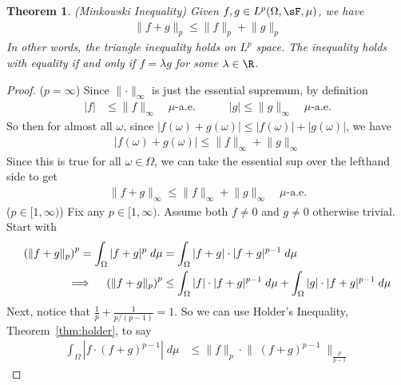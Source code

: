 \documentclass[12pt]{article}
\theoremstyle{plain}
\newtheorem{thm}{Theorem}[section]
\theoremstyle{definition}
\theoremstyle{remark}
\begin{document}
\begin{thm}\emph{(Minkowski Inequality)}
\label{thm:minkowski}
Given $f,g \in L^p(\Omega,\sF,\mu)$, we have
\begin{align*}
  \lVert f+g\rVert_p \leq \lVert f\rVert_p + \lVert g\rVert_p
\end{align*}
In other words, the triangle inequality holds on $L^p$ space.
The inequality holds with equality if and only if
$f=\lambda g$ for some $\lambda\in \R$.
\end{thm}
\begin{proof}
($p=\infty$)
Since $\lVert  \cdot\rVert_\infty$ is just the essential supremum, by definition
\begin{align*}
    |f|&\leq \lVert  f\rVert_\infty
    \quad \text{$\mu$-a.e.}
    \qquad\quad
    |g|\leq \lVert  g\rVert_\infty
    \quad \text{$\mu$-a.e.}
\end{align*}
So then for almost all $\omega$, since
$|f(\omega)+g(\omega)|\leq |f(\omega)|+|g(\omega)|$, we have
\begin{align*}
    |f(\omega)+g(\omega)|\leq \lVert  f\rVert_\infty
    + \lVert  g\rVert_\infty
\end{align*}
Since this is true for all $\omega\in\Omega$, we can take the essential
sup over the lefthand side to get
\begin{align*}
    \lVert  f+g\rVert_\infty
    \leq \lVert  f\rVert_\infty
    + \lVert  g\rVert_\infty
    \quad \text{$\mu$-a.e.}
\end{align*}
($p\in[1,\infty)$)
Fix any $p\in[1,\infty)$. Assume both $f\neq 0$ and $g\neq 0$ otherwise
trivial. Start with
\begin{align}
  \left(\lVert f+g\rVert_p\right)^p
  = \int_\Omega |f+g|^p \; d\mu
  &= \int_\Omega |f+g| \cdot |f+g|^{p-1}\; d\mu \notag \\
  \implies\quad
  \left(\lVert f+g\rVert_p\right)^p
  &\leq
  \int_\Omega |f|\cdot |f+g|^{p-1}\; d\mu
  +
  \int_\Omega |g| \cdot |f+g|^{p-1}\; d\mu
  \label{fplusg}
\end{align}
Next, notice that $\frac{1}{p} +\frac{1}{p/(p-1)}=1$. So we can use
Holder's Inequality, Theorem~\ref{thm:holder}, to say
\begin{align*}
  \int_\Omega \left| f\cdot(f+g)^{p-1}\right|\; d\mu
  &\leq
  \lVert f\rVert_p \cdot
  \big\lVert\;(f+g)^{p-1}\;\big\rVert_{\frac{p}{p-1}}

\end{align*}
\end{proof}
\end{document}
